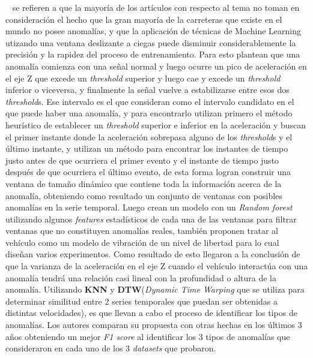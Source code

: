 ~\parencite{zheng2020fused} se refieren a que la mayoría de los artículos con respecto al tema no toman en consideración el hecho que la gran mayoría de la
carreteras que existe en el mundo no posee anomalías, y que la aplicación de técnicas de Machine Learning utizando una ventana deslizante a ciegas puede
disminuir considerablemente la precisión y la rapidez del proceso de entrenamiento. Para esto plantean que una anomalía comienza con una señal normal
y luego ocurre un pico de aceleración en el eje Z que excede un \emph{threshold} superior y luego cae y excede un \emph{threshold} inferior o viceversa,
y finalmente la señal vuelve a estabilizarse entre esos dos \emph{threshold}s. Ese intervalo es el que consideran como el intervalo candidato en el que
puede haber una anomalía, y para encontrarlo utilizan primero el método heurístico de establecer un \emph{threshold} superior e inferior en la aceleración
y buscan el primer instante donde la aceleración sobrepasa alguno de los \emph{threshold}s y el último instante, y utilizan un método para encontrar los
instantes de tiempo justo antes de que ocurriera el primer evento y el instante de tiempo justo después de que ocurriera el último evento, de esta forma
logran construir una ventana de tamaño dinámico que contiene toda la información acerca de la anomalía, obteniendo como resultado un conjunto de ventanas
con posibles anomalías en la serie temporal. Luego crean un modelo con un \emph{Random forest} utilizando algunos \emph{features} estadísticos de cada una de las ventanas
para filtrar ventanas que no constituyen anomalías reales, también proponen tratar al vehículo como un modelo de vibración de un nivel de libertad para lo
cual diseñan varios experimentos. Como resultado de esto llegaron a la conclusión de que la varianza de la aceleración en el eje Z cuando el vehículo interactúa
con una anomalía tendrá una relación casi lineal con la profundidad o altura de la anomalía. Utilizando \textbf{KNN} y \textbf{DTW}(\emph{Dynamic Time Warping}
que se utiliza para determinar similitud entre 2 series temporales que puedan ser obtenidas a distintas velocidades), es que llevan a cabo el proceso
de identificar los tipos de anomalías. Los autores comparan su propuesta con otras hechas en los últimos 3 años obteniendo un mejor \emph{F1 score} al
identificar los 3 tipos de anomalías que consideraron en cada uno de los 3 \emph{datasets} que probaron.\\

